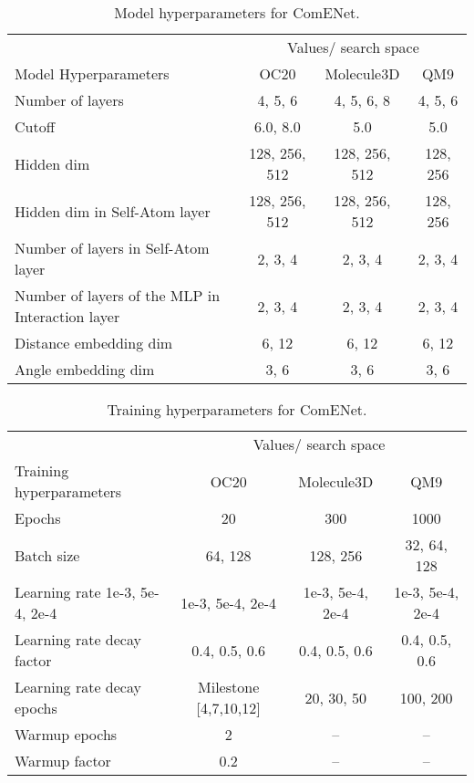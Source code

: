 \documentclass{article}
\begin{document}
\begin{table*}[ht]
\begin{center}
\caption{Model hyperparameters for ComENet.}
\label{tb:model_hyperpara}
{\begin{tabular}{l|ccc}\toprule
&\multicolumn{3}{c}{Values/ search space} \\
\cmidrule(l{4pt}r{4pt}){2-4}
Model Hyperparameters & OC20 &Molecule3D &QM9\\
\midrule
Number of layers &4, 5, 6 &4, 5, 6, 8 &4, 5, 6 \\
Cutoff &6.0, 8.0 &5.0 &5.0 \\
Hidden dim &128, 256, 512 &128, 256, 512 &128, 256 \\
Hidden dim in Self-Atom layer &128, 256, 512 &128, 256, 512 &128, 256 \\
Number of layers in Self-Atom layer &2, 3, 4 &2, 3, 4 &2, 3, 4 \\
Number of layers of the MLP in Interaction layer &2, 3, 4 &2, 3, 4 &2, 3, 4 \\
Distance embedding dim & 6, 12 &6, 12 &6, 12 \\
Angle embedding dim & 3, 6 &3, 6 &3, 6 \\
\bottomrule
\end{tabular}}
\end{center}
\end{table*}

\begin{table}[ht] \begin{center}
\caption{Training hyperparameters for ComENet.}
\label{tb:training_hyperpara}
{\begin{tabular}{l|ccc}\toprule
&\multicolumn{3}{c}{Values/ search space} \\
\cmidrule(l{4pt}r{4pt}){2-4}
Training hyperparameters  &OC20 &Molecule3D &QM9 \\
\midrule
Epochs &20 &300 &1000 \\
Batch size &64, 128 &128, 256 &32, 64, 128 \\
Learning rate 1e-3, 5e-4, 2e-4 & 1e-3, 5e-4, 2e-4 & 1e-3, 5e-4, 2e-4 &1e-3, 5e-4, 2e-4 \\
Learning rate decay factor &0.4, 0.5, 0.6 &0.4, 0.5, 0.6 &0.4, 0.5, 0.6 \\
Learning rate decay epochs &Milestone [4,7,10,12] &20, 30, 50 &100, 200 \\
Warmup epochs &2 &-- &-- \\
Warmup factor &0.2 &-- &-- \\
\bottomrule
\end{tabular}}
\end{center}
\end{table}
\end{document}
